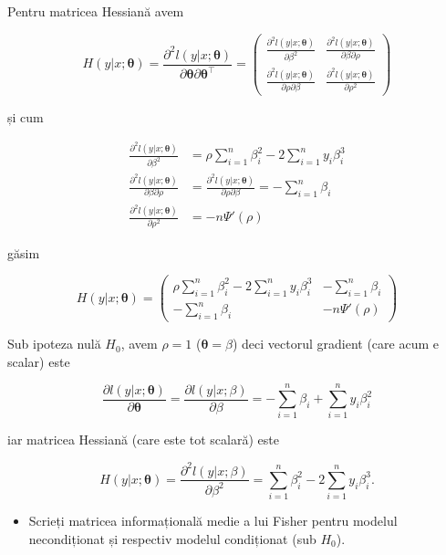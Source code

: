 \documentclass[]{article}
\newenvironment{frshaded*}{%
  \def\FrameCommand{\fboxrule=\FrameRule\fboxsep=\FrameSep \fcolorbox{framecolor}{shadecolor1}}%
  \MakeFramed {\advance\hsize-\width \FrameRestore}}%
{\endMakeFramed}
\newenvironment{rmdblock}[1]
  {\begin{frshaded*}
  \begin{itemize}
  \renewcommand{\labelitemi}{
    \raisebox{-.7\height}[0pt][0pt]{
      {\setkeys{Gin}{width=2em,keepaspectratio}\texttt{[image: images/icons/\#1]}}
    }
  }
  \item
  }
  {
  \end{itemize}
  \end{frshaded*}
  }
\newenvironment{rmdexercise}
  {\begin{rmdblock}{exercise}}
  {\end{rmdblock}}
\begin{document}
Pentru matricea Hessiană avem

\[
H(y|x;\boldsymbol{\theta}) = \frac{\partial^2 l(y|x;\boldsymbol{\theta})}{\partial \boldsymbol{\theta}\partial \boldsymbol{\theta}^\intercal} = \begin{pmatrix}
  \frac{\partial^2 l(y|x;\boldsymbol{\theta})}{\partial \beta^2} & \frac{\partial^2 l(y|x;\boldsymbol{\theta})}{\partial \beta\partial \rho}\\
  \frac{\partial^2 l(y|x;\boldsymbol{\theta})}{\partial \rho\partial \beta} & \frac{\partial^2 l(y|x;\boldsymbol{\theta})}{\partial \rho^2}
\end{pmatrix}
\]

și cum

\begin{align*}
  \frac{\partial^2 l(y|x;\boldsymbol{\theta})}{\partial \beta^2} &= \rho\sum_{i=1}^{n}\beta_i^2 - 2\sum_{i=1}^{n}y_i\beta_i^3\\
  \frac{\partial^2 l(y|x;\boldsymbol{\theta})}{\partial \beta\partial \rho} &= \frac{\partial^2 l(y|x;\boldsymbol{\theta})}{\partial \rho\partial \beta} = - \sum_{i=1}^{n}\beta_i\\
  \frac{\partial^2 l(y|x;\boldsymbol{\theta})}{\partial \rho^2} &= -n\Psi'(\rho)
\end{align*}

găsim

\[
H(y|x;\boldsymbol{\theta}) = 
\begin{pmatrix}
  \rho\sum_{i=1}^{n}\beta_i^2 - 2\sum_{i=1}^{n}y_i\beta_i^3 & -\sum_{i=1}^{n}\beta_i \\
  -\sum_{i=1}^{n}\beta_i & -n\Psi'(\rho)
\end{pmatrix}
\]

Sub ipoteza nulă \(H_0\), avem \(\rho = 1\)
(\(\boldsymbol{\theta} = \beta\)) deci vectorul gradient (care acum e
scalar) este

\[
\frac{\partial l(y|x;\boldsymbol{\theta})}{\partial \boldsymbol{\theta}} = \frac{\partial l(y|x;\beta)}{\partial \beta} = -\sum_{i=1}^{n}\beta_i + \sum_{i=1}^{n}y_i\beta_i^2
\]

iar matricea Hessiană (care este tot scalară) este

\[
H(y|x;\boldsymbol{\theta}) = \frac{\partial^2 l(y|x;\beta)}{\partial \beta^2} = \sum_{i=1}^{n}\beta_i^2 - 2\sum_{i=1}^{n}y_i\beta_i^3.
\]

\begin{rmdexercise}
Scrieți matricea informațională medie a lui Fisher pentru modelul
necondiționat și respectiv modelul condiționat (sub \(H_0\)).
\end{rmdexercise}
\end{document}
